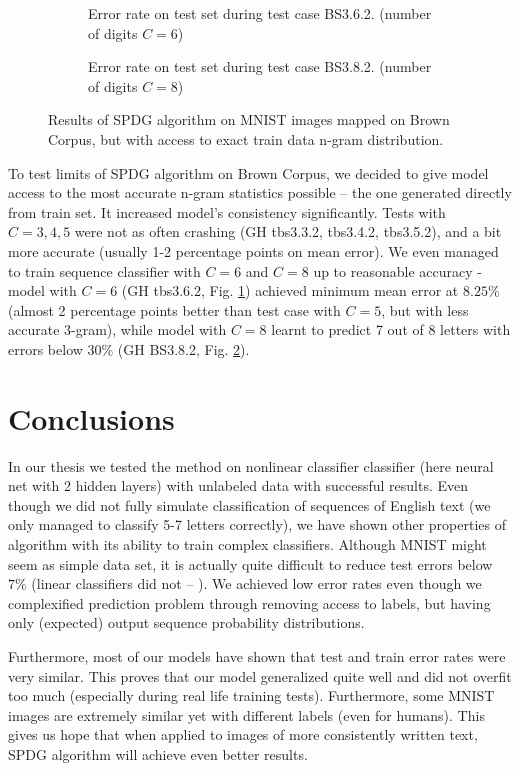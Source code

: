 \documentclass[declaration,shortabstract,lic,english]{iithesis}
\begin{document}
\begin{figure}[ht]
\begin{subfigure}[b]{.49\textwidth}
    \def\svgwidth{\textwidth}
    
    \caption{Error rate on test set during test case BS3.6.2. (number of digits $C=6$)}
    \label{fig:tbs362_test_error}
\end{subfigure}
\begin{subfigure}[b]{.49\textwidth}
    \def\svgwidth{\textwidth}
    
    \caption{Error rate on test set during test case BS3.8.2. (number of digits $C=8$)}
    \label{fig:tbs382_test_error}
\end{subfigure}
\caption{Results of SPDG algorithm on MNIST images mapped on Brown Corpus, but with access to exact train data n-gram distribution.}
\label{fig:tbs2_results}
\end{figure}

To test limits of SPDG algorithm on Brown Corpus, we decided to give model access to the most accurate n-gram statistics possible -- the one generated directly from train set. It increased model's consistency significantly. Tests with $C=3,4,5$ were not as often crashing (GH tbs3.3.2, tbs3.4.2, tbs3.5.2), and a bit more accurate (usually 1-2 percentage points on mean error). We even managed to train sequence classifier with $C=6$ and $C=8$ up to reasonable accuracy - model with $C=6$ (GH tbs3.6.2, Fig. \ref{fig:tbs362_test_error}) achieved minimum mean error at $8.25\%$ (almost 2 percentage points better than test case with $C=5$, but with less accurate 3-gram), while model with $C=8$ learnt to predict 7 out of 8 letters with errors below $30\%$ (GH BS3.8.2, Fig. \ref{fig:tbs382_test_error}).

\chapter{Conclusions}

In our thesis we tested the \citet{liu2017unsupervised} method on nonlinear classifier classifier (here neural net with 2 hidden layers) with unlabeled data with successful results. Even though we did not fully simulate classification of sequences of English text (we only managed to classify 5-7 letters correctly), we have shown other properties of algorithm with its ability to train complex classifiers. Although MNIST might seem as simple data set, it is actually quite difficult to reduce test errors below $7\%$ (linear classifiers did not -- \cite{mnist}). We achieved low error rates even though we complexified prediction problem through removing access to labels, but having only (expected) output sequence probability distributions.

Furthermore, most of our models have shown that test and train error rates were very similar. This proves that our model generalized quite well and did not overfit too much (especially during real life training tests). Furthermore, some MNIST images are extremely similar yet with different labels (even for humans). This gives us hope that when applied to images of more consistently written text, SPDG algorithm will achieve even better results.



\end{document}
